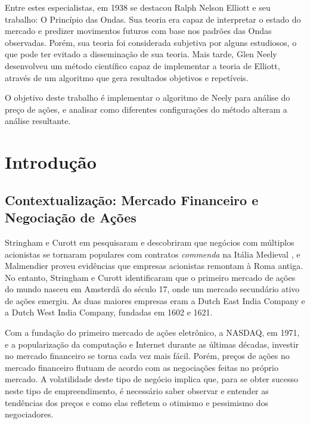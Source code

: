 \documentclass[12pt]{article}
\begin{document}
Entre estes especialistas, em 1938 se destacou Ralph Nelson Elliott e seu trabalho:
O Princípio das Ondas.
Sua teoria era capaz de interpretar o estado do mercado e predizer movimentos futuros com
base nos padrões das Ondas observadas. Porém, sua teoria foi considerada subjetiva por alguns
estudiosos, o que pode ter evitado a disseminação de sua teoria. Mais tarde, Glen Neely
desenvolveu um método científico capaz de implementar a teoria de Elliott, através de um
algoritmo que gera resultados objetivos e repetíveis.

O objetivo deste trabalho é implementar o algoritmo de Neely para análise do preço de ações,
e analisar como diferentes configurações do método alteram a análise resultante.

\newpage


{}
\listoffigures

\newpage
{}
{}
\listoftables

\newpage

{}
\tableofcontents

\newpage


\section{Introdução}
\subsection{Contextualização: Mercado Financeiro e Negociação de Ações} \label{sec:Stockmarket}

Stringham e Curott em \cite{StringhamCurott:2015} pesquisaram e descobriram que 
negócios com múltiplos acionistas se tornaram populares com contratos \textit{commenda}
na Itália Medieval \cite{Greif:2006}, e Malmendier \cite{Malmendier:2009} proveu evidências
que empresas acionistas remontam à Roma antiga. No entanto, Stringham e Curott identificaram
que o primeiro mercado de ações do mundo nasceu em Amsterdã do século 17, onde um mercado
secundário ativo de ações emergiu. As duas maiores empresas eram a Dutch East India Company
e a Dutch West India Company, fundadas em 1602 e 1621. 

Com a fundação do primeiro mercado de ações eletrônico, a NASDAQ, em 1971, e a popularização
da computação e Internet durante as últimas décadas, investir no mercado financeiro se
torna cada vez mais fácil. Porém, preços de ações no mercado financeiro flutuam de acordo
com as negociações feitas no próprio mercado. A volatilidade deste tipo de negócio implica
que, para se obter sucesso neste tipo de empreendimento, é necessário saber observar e entender
as tendências dos preços e como elas refletem o otimismo e pessimismo dos negociadores.
\end{document}
